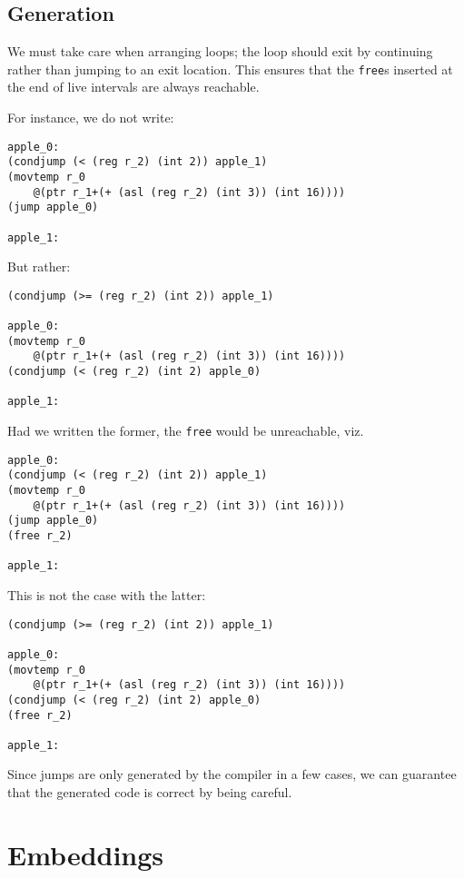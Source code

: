 \documentclass[sigplan,screen]{acmart}
\begin{document}
\subsection{Generation}

We must take care when arranging loops; the loop should exit by continuing rather than jumping to an exit location. This ensures that the {\tt free}s inserted at the end of live intervals are always reachable.

For instance, we do not write:

\begin{verbatim}
apple_0:
(condjump (< (reg r_2) (int 2)) apple_1)
(movtemp r_0
    @(ptr r_1+(+ (asl (reg r_2) (int 3)) (int 16))))
(jump apple_0)

apple_1:
\end{verbatim}

But rather:

\begin{verbatim}
(condjump (>= (reg r_2) (int 2)) apple_1)

apple_0:
(movtemp r_0
    @(ptr r_1+(+ (asl (reg r_2) (int 3)) (int 16))))
(condjump (< (reg r_2) (int 2) apple_0)

apple_1:
\end{verbatim}

Had we written the former, the {\tt free} would be unreachable, viz.

\begin{verbatim}
apple_0:
(condjump (< (reg r_2) (int 2)) apple_1)
(movtemp r_0
    @(ptr r_1+(+ (asl (reg r_2) (int 3)) (int 16))))
(jump apple_0)
(free r_2)

apple_1:
\end{verbatim}

This is not the case with the latter:

\begin{verbatim}
(condjump (>= (reg r_2) (int 2)) apple_1)

apple_0:
(movtemp r_0
    @(ptr r_1+(+ (asl (reg r_2) (int 3)) (int 16))))
(condjump (< (reg r_2) (int 2) apple_0)
(free r_2)

apple_1:
\end{verbatim}

Since jumps are only generated by the compiler in a few cases, we can guarantee that the generated code is correct by being careful.

\section{Embeddings}
\end{document}
